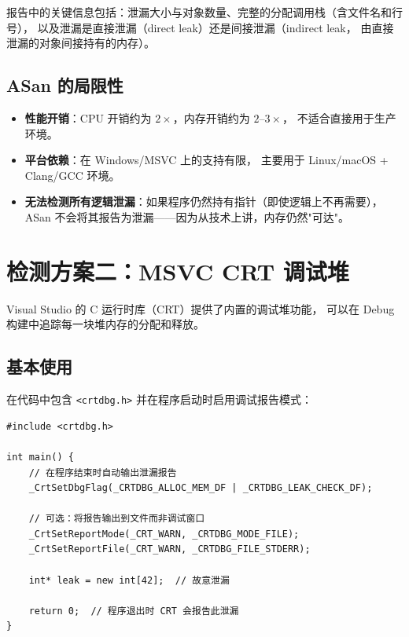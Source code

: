 \documentclass[12pt,a4paper,fontset=fandol]{ctexbook}
\begin{document}
报告中的关键信息包括：泄漏大小与对象数量、完整的分配调用栈（含文件名和行号），
以及泄漏是直接泄漏（direct leak）还是间接泄漏（indirect leak，
由直接泄漏的对象间接持有的内存）。

\subsection{ASan 的局限性}

\begin{itemize}[nosep]
  \item \textbf{性能开销}：CPU 开销约为 $2\times$，内存开销约为 $2$--$3\times$，
    不适合直接用于生产环境。
  \item \textbf{平台依赖}：在 Windows/MSVC 上的支持有限，
    主要用于 Linux/macOS + Clang/\allowbreak{}\allowbreak GCC 环境。
  \item \textbf{无法检测所有逻辑泄漏}：如果程序仍然持有指针（即使逻辑上不再需要），
    ASan 不会将其报告为泄漏——因为从技术上讲，内存仍然"可达"。
\end{itemize}


\section{检测方案二：MSVC CRT 调试堆}

Visual Studio 的 C 运行时库（CRT）提供了内置的调试堆功能，
可以在 Debug 构建中追踪每一块堆内存的分配和释放。

\subsection{基本使用}

在代码中包含 \texttt{<crtdbg.h>} 并在程序启动时启用调试报告模式：

\begin{lstlisting}[style=cppstyle, caption={MSVC CRT 调试堆基本用法}]
#include <crtdbg.h>

int main() {
    // 在程序结束时自动输出泄漏报告
    _CrtSetDbgFlag(_CRTDBG_ALLOC_MEM_DF | _CRTDBG_LEAK_CHECK_DF);

    // 可选：将报告输出到文件而非调试窗口
    _CrtSetReportMode(_CRT_WARN, _CRTDBG_MODE_FILE);
    _CrtSetReportFile(_CRT_WARN, _CRTDBG_FILE_STDERR);

    int* leak = new int[42];  // 故意泄漏

    return 0;  // 程序退出时 CRT 会报告此泄漏
}
\end{lstlisting}
\end{document}
